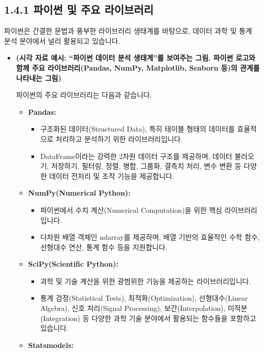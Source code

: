 \documentclass[
  letterpaper,
]{book}
\providecommand{\tightlist}{%
  \setlength{\itemsep}{0pt}\setlength{\parskip}{0pt}}
\begin{document}
\subsection{1.4.1 파이썬 및 주요
라이브러리}\label{uxd30cuxc774uxc36c-uxbc0f-uxc8fcuxc694-uxb77cuxc774uxbe0cuxb7ecuxb9ac}

파이썬은 간결한 문법과 풍부한 라이브러리 생태계를 바탕으로, 데이터 과학
및 통계 분석 분야에서 널리 활용되고 있습니다.

\begin{itemize}
\item
  \textbf{(시각 자료 예시: ``파이썬 데이터 분석 생태계''를 보여주는
  그림. 파이썬 로고와 함께 주요 라이브러리(Pandas, NumPy, Matplotlib,
  Seaborn 등)의 관계를 나타내는 그림)}

  파이썬의 주요 라이브러리는 다음과 같습니다.

  \begin{itemize}
  \tightlist
  \item
    \textbf{Pandas:}

    \begin{itemize}
    \tightlist
    \item
      구조화된 데이터(Structured Data), 특히 테이블 형태의 데이터를
      효율적으로 처리하고 분석하기 위한 라이브러리입니다.
    \item
      DataFrame이라는 강력한 2차원 데이터 구조를 제공하며, 데이터
      불러오기, 저장하기, 필터링, 정렬, 병합, 그룹화, 결측치 처리, 변수
      변환 등 다양한 데이터 전처리 및 조작 기능을 제공합니다.
    \end{itemize}
  \item
    \textbf{NumPy(Numerical Python):}

    \begin{itemize}
    \tightlist
    \item
      파이썬에서 수치 계산(Numerical Computation)을 위한 핵심
      라이브러리입니다.
    \item
      다차원 배열 객체인 ndarray를 제공하며, 배열 기반의 효율적인 수학
      함수, 선형대수 연산, 통계 함수 등을 지원합니다.
    \end{itemize}
  \item
    \textbf{SciPy(Scientific Python):}

    \begin{itemize}
    \tightlist
    \item
      과학 및 기술 계산을 위한 광범위한 기능을 제공하는
      라이브러리입니다.
    \item
      통계 검정(Statistical Tests), 최적화(Optimization),
      선형대수(Linear Algebra), 신호 처리(Signal Processing),
      보간(Interpolation), 미적분(Integration) 등 다양한 과학 기술
      분야에서 활용되는 함수들을 포함하고 있습니다.
    \end{itemize}
  \item
    \textbf{Statsmodels:}


\end{itemize}
\end{itemize}
\end{document}
